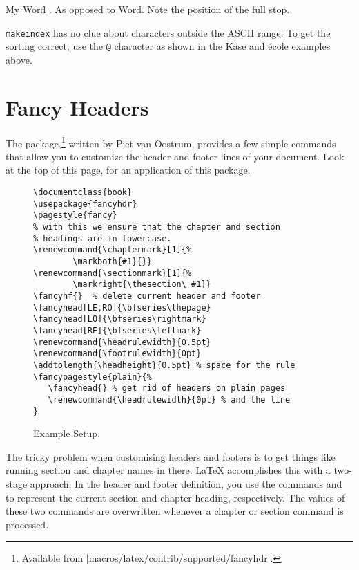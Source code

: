 \begin{example}
My Word . As opposed
to Word. Note the
position of the full stop.
\end{example}

\texttt{makeindex} has no clue about characters outside the ASCII range. To
get the sorting correct, use the \verb|@| character as shown in the K\"ase
and \'ecole examples above.

\section{Fancy Headers}
\label{sec:fancy}

The  package,\footnote{Available from
  \CTAN|macros/latex/contrib/supported/fancyhdr|.} written by
Piet van Oostrum, provides a few simple commands that allow you to
customize the header and footer lines of your document.  Look
at the top of this page, for an application of this
package.

\begin{figure}[!htbp]
\begin{lined}{\textwidth}
\begin{verbatim}
\documentclass{book}
\usepackage{fancyhdr}
\pagestyle{fancy}
% with this we ensure that the chapter and section
% headings are in lowercase.
\renewcommand{\chaptermark}[1]{%
        \markboth{#1}{}}
\renewcommand{\sectionmark}[1]{%
        \markright{\thesection\ #1}}
\fancyhf{}  % delete current header and footer
\fancyhead[LE,RO]{\bfseries\thepage}
\fancyhead[LO]{\bfseries\rightmark}
\fancyhead[RE]{\bfseries\leftmark}
\renewcommand{\headrulewidth}{0.5pt}
\renewcommand{\footrulewidth}{0pt}
\addtolength{\headheight}{0.5pt} % space for the rule
\fancypagestyle{plain}{%
   \fancyhead{} % get rid of headers on plain pages
   \renewcommand{\headrulewidth}{0pt} % and the line
}
\end{verbatim}
\end{lined}
\caption{Example  Setup.} \label{fancyhdr}
\end{figure}

The tricky problem when customising headers and footers is to get
things like running section and chapter names in there. \LaTeX{}
accomplishes this with a two-stage approach. In the header and footer
definition, you use the commands  and  to
represent the current section and chapter heading, respectively.
The values of these two commands are overwritten whenever a chapter or
section command is processed.

